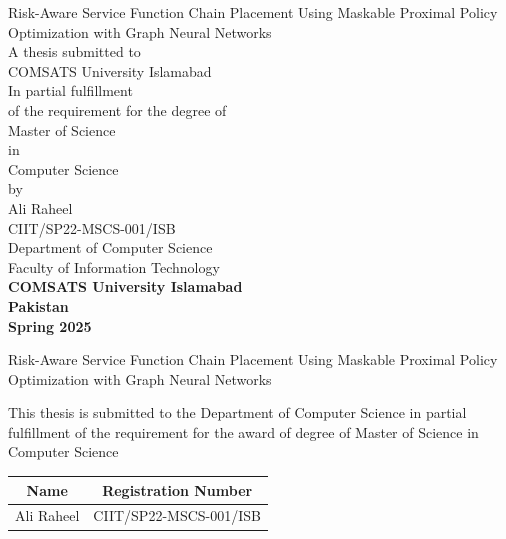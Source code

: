 \documentclass[A4paper,12pt]{report}
\theoremstyle{plain}
\theoremstyle{definition}
\theoremstyle{remark}
\numberwithin{equation}{section}
\begin{document}
\begin{center}
\vspace{0.1in}
\LARGE{Risk-Aware Service Function Chain Placement Using Maskable Proximal Policy Optimization with Graph Neural Networks} \\
\vspace{0.5in}
\Large{A thesis submitted to}\\
\vspace{0in}
\Large{COMSATS University Islamabad}\\
\vspace{0.3in}
\large{In partial fulfillment\\
of the requirement for the degree of}\\
\vspace{0.3in}
\large{Master of Science}\\
\large{in}\\
\large{Computer Science}\\
\vspace{0.2in}
\normalsize{by}\\
\large{Ali Raheel\\
\vspace{0.1in}
CIIT/SP22-MSCS-001/ISB}\\
\vspace{0.2in}
\large{Department of Computer Science}\\
\large{Faculty of Information Technology}\\
\vspace{0.3in}
\Large {\textbf{COMSATS University Islamabad\\
Pakistan}}\\
\vspace{0.2in}
\Large{\textbf{Spring 2025}}
\end{center}


\newpage
\begin{center}
\LARGE{Risk-Aware Service Function Chain Placement Using Maskable Proximal Policy Optimization with Graph Neural Networks}\\
\end{center}
\vspace{0.2in}
\noindent\large{This thesis is submitted to the Department of Computer Science in partial fulfillment of the requirement for the award of degree of Master of Science in Computer Science}
\vspace{0.02in}
\begin{table}[!ht]
\centering
{\setlength{\arrayrulewidth}{.5mm}
\setlength{\tabcolsep}{53pt}
\renewcommand{\arraystretch}{2}
\begin{tabular}{|c|c|}
\hline
\rowcolor[HTML]{656565}
 \large{Name} &\large{Registration Number}  \\
 \hline
Ali Raheel & CIIT/SP22-MSCS-001/ISB \\ \hline
\end{tabular}
}
\vspace{0.3in}
\end{table}
\vspace{2in}
\end{document}
